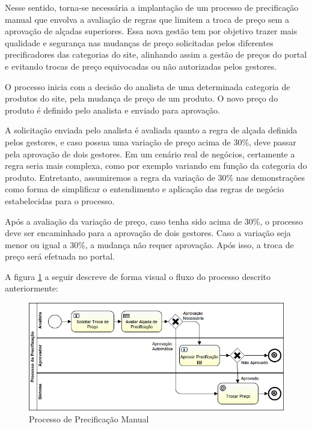 Nesse sentido, torna-se necessária a implantação de um processo de precificação manual que envolva a avaliação de regras que limitem a troca de preço sem a aprovação de alçadas superiores. Essa nova gestão tem por objetivo trazer mais qualidade e segurança nas mudanças de preço solicitadas pelos diferentes precificadores das categorias do site, alinhando assim a gestão de preços do portal e evitando trocas de preço equivocadas ou não autorizadas pelos gestores.

O processo inicia com a decisão do analista de uma determinada categoria de produtos do site, pela mudança de preço de um produto. O novo preço do produto é definido pelo analista e enviado para aprovação.

A solicitação enviada pelo analista é avaliada quanto a regra de alçada definida pelos gestores, e caso possua uma variação de preço acima de 30\%, deve passar pela aprovação de dois gestores. Em um cenário real de negócios, certamente a regra seria mais complexa, como por exemplo variando em função da categoria do produto. Entretanto, assumiremos a regra da variação de 30\% nas demonstrações como forma de simplificar o entendimento e aplicação das regras de negócio estabelecidas para o processo.

Após a avaliação da variação de preço, caso tenha sido acima de 30\%, o processo deve ser encaminhado para a aprovação de dois gestores. Caso a variação seja menor ou igual a 30\%, a mudança não requer aprovação. Após isso, a troca de preço será efetuada no portal.

A figura \ref{fig:exemplo_bpmn-problema} a seguir descreve de forma visual o fluxo do processo descrito anteriormente:

\begin{figure}[H]
  \centering
  \includegraphics[width=1.0\textwidth]{imagens/ProcessoDePrecificacao.png}
  \caption{Processo de Precificação Manual}
  \label{fig:exemplo_bpmn-problema}
\end{figure}

